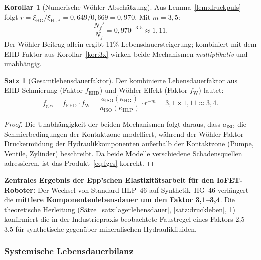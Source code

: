 ﻿\documentclass[a4paper,12pt]{scrreprt}
\theoremstyle{definition}
\newtheorem{satz}{Satz}[section]
\newtheorem{korollar}{Korollar}[section]
\begin{document}
\begin{korollar}[Numerische Wöhler-Abschätzung]
\label{kor:woehler}
Aus Lemma~\ref{lem:druckpuls} folgt $r = \xi_{\text{HG}}/\xi_{\text{HLP}} = 0{,}649/0{,}669 = 0{,}970$. Mit $m = 3{,}5$:
\begin{equation}
  \frac{N_{f}'}{N_{f}} = 0{,}970^{-3{,}5} \approx 1{,}11.
\end{equation}
Der Wöhler-Beitrag allein ergibt 11\% Lebensdauersteigerung; kombiniert
mit dem EHD-Faktor aus Korollar~\ref{kor:3x} wirken beide Mechanismen
\emph{multiplikativ} und unabhängig.
\end{korollar}

\begin{satz}[Gesamtlebensdauerfaktor]
\label{satz:gesamtleben}
Der kombinierte Lebensdauerfaktor aus EHD-Schmierung (Faktor $f_{\text{EHD}}$)
und Wöhler-Effekt (Faktor $f_{\text{W}}$) lautet:
\begin{equation}
  f_{\text{ges}} = f_{\text{EHD}} \cdot f_{\text{W}}
  = \frac{a_{\text{ISO}}(\kappa_{\text{HG}})}{a_{\text{ISO}}(\kappa_{\text{HLP}})}
  \cdot r^{-m}
  = 3{,}1 \times 1{,}11
  \approx 3{,}4.
  \label{eq:fges}
\end{equation}
\end{satz}

\begin{proof}
Die Unabhängigkeit der beiden Mechanismen folgt daraus, dass
$a_{\text{ISO}}$ die Schmierbedingungen der Kontaktzone modelliert,
während der Wöhler-Faktor Druckermüdung der Hydraulikkomponenten
außerhalb der Kontaktzone (Pumpe, Ventile, Zylinder) beschreibt.
Da beide Modelle verschiedene Schadensquellen adressieren, ist das
Produkt~\eqref{eq:fges} korrekt.
\end{proof}

\begin{infobox}
\textbf{Zentrales Ergebnis der Epp'schen Elastizitätsarbeit
für den IoFET-Roboter:}
Der Wechsel von Standard-HLP~46 auf Synthetik~HG~46
verlängert die \textbf{mittlere Komponentenlebensdauer um den
Faktor 3,1--3,4}. Die theoretische Herleitung (Sätze~\ref{satz:lagerlebensdauer},
\ref{satz:druckleben}, \ref{satz:gesamtleben}) konfirmiert die in der
Industriepraxis beobachtete Faustregel eines Faktors 2,5--3,5 für
synthetische gegenüber mineralischen Hydraulikfluiden.
\end{infobox}

\subsubsection{Systemische Lebensdauerbilanz}
\end{document}
